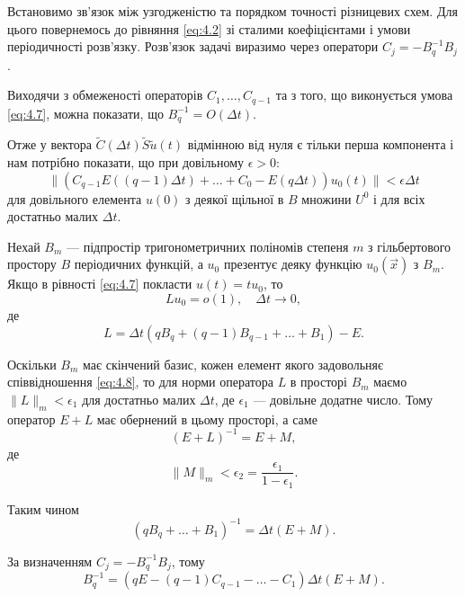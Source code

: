 Встановимо зв'язок між узгодженістю та порядком точності різницевих схем. Для цього повернемось до рівняння \eqref{eq:4.2} зі сталими коефіцієнтами і умови періодичності розв'язку. Розв'язок задачі виразимо через оператори $C_j = -B_q^{-1} B_j$. \medskip

Виходячи з обмеженості операторів $C_1, \ldots, C_{q - 1}$ та з того, що виконується умова \eqref{eq:4.7}, можна показати, що $B_q^{-1} = O(\Delta t)$. \medskip

Отже у вектора $\tilde C(\Delta t) \tilde S \tilde u(t)$ відмінною від нуля є тільки перша компонента і нам потрібно показати, що при довільному $\epsilon > 0$:
\begin{equation}
    \| (C_{q - 1} E ( (q - 1) \Delta t) + \ldots + C_0 - E (q \Delta t) ) u_0(t) \| < \epsilon \Delta t
\end{equation}
для довільного елемента $u(0)$ з деякої щільної в $B$ множини $U^0$ і для всіх достатньо малих $\Delta t$. \medskip

Нехай $B_m$ --- підпростір тригонометричних поліномів степеня $m$ з гільбертового простору $B$ періодичних функцій, а $u_0$ презентує деяку функцію $u_0(\vec x)$ з $B_m$. Якщо в рівності \eqref{eq:4.7} покласти $u(t) = t u_0$, то 
\begin{equation}
    \label{eq:4.8}
    L u_0 = o(1), \quad \Delta t \to 0,
\end{equation}
де
\begin{equation}
    \label{eq:4.9}
    L = \Delta t ( q B_q + (q - 1) B_{q - 1} + \ldots + B_1 ) - E.
\end{equation}

Оскільки $B_m$ має скінчений базис, кожен елемент якого задовольняє співвідношення \eqref{eq:4.8}, то для норми оператора $L$ в просторі $B_m$ маємо $\|L\|_m < \epsilon_1$ для достатньо малих $\Delta t$, де $\epsilon_1$ --- довільне додатне число. Тому оператор $E + L$ має обернений в цьому просторі, а саме
\begin{equation}
    (E + L)^{-1} = E + M,
\end{equation}
де
\begin{equation}
    \|M\|_m < \epsilon_2 = \frac{\epsilon_1}{1 - \epsilon_1}.    
\end{equation}

Таким чином
\begin{equation}
    (q B_q + \ldots + B_1)^{-1} = \Delta t (E + M).
\end{equation}

За визначенням $C_j = -B_q^{-1} B_j$, тому
\begin{equation}
    \label{eq:4.10}
    B_q^{-1} = (q E - (q - 1) C_{q - 1} - \ldots - C_1) \Delta t (E + M).
\end{equation}

